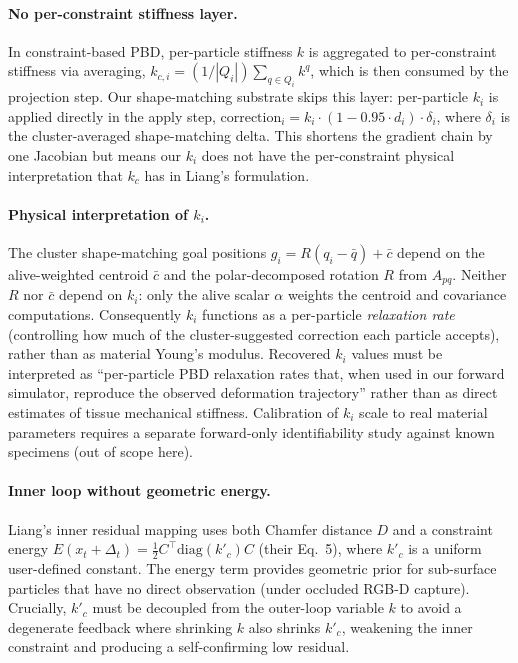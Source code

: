 \paragraph{No per-constraint stiffness layer.}
In constraint-based PBD, per-particle stiffness $k$ is aggregated to
per-constraint stiffness via averaging,
$k_{c,i} = (1/|Q_i|)\sum_{q \in Q_i} k^q$, which is then consumed by the
projection step. Our shape-matching substrate skips this layer: per-particle
$k_i$ is applied directly in the apply step,
$\text{correction}_i = k_i \cdot (1 - 0.95 \cdot d_i) \cdot \delta_i$,
where $\delta_i$ is the cluster-averaged shape-matching delta.
This shortens the gradient chain by one Jacobian but means our $k_i$
does not have the per-constraint physical interpretation that $k_c$
has in Liang's formulation.

\paragraph{Physical interpretation of $k_i$.}
The cluster shape-matching goal positions
$g_i = R(q_i - \bar{q}) + \bar{c}$ depend on the alive-weighted centroid
$\bar{c}$ and the polar-decomposed rotation $R$ from $A_{pq}$. Neither
$R$ nor $\bar{c}$ depend on $k_i$: only the alive scalar $\alpha$
weights the centroid and covariance computations. Consequently $k_i$
functions as a per-particle \emph{relaxation rate} (controlling how much
of the cluster-suggested correction each particle accepts), rather than
as material Young's modulus. Recovered $k_i$ values must be interpreted
as ``per-particle PBD relaxation rates that, when used in our forward
simulator, reproduce the observed deformation trajectory'' rather than
as direct estimates of tissue mechanical stiffness. Calibration of $k_i$
scale to real material parameters requires a separate forward-only
identifiability study against known specimens (out of scope here).

\paragraph{Inner loop without geometric energy.}
Liang's inner residual mapping uses both Chamfer distance $D$ and a
constraint energy $E(x_t + \Delta_t) = \tfrac{1}{2} C^\top \mathrm{diag}(k'_c) C$
(their Eq.~5), where $k'_c$ is a uniform user-defined constant. The
energy term provides geometric prior for sub-surface particles that
have no direct observation (under occluded RGB-D capture). Crucially,
$k'_c$ must be decoupled from the outer-loop variable $k$ to avoid
a degenerate feedback where shrinking $k$ also shrinks $k'_c$, weakening
the inner constraint and producing a self-confirming low residual.

